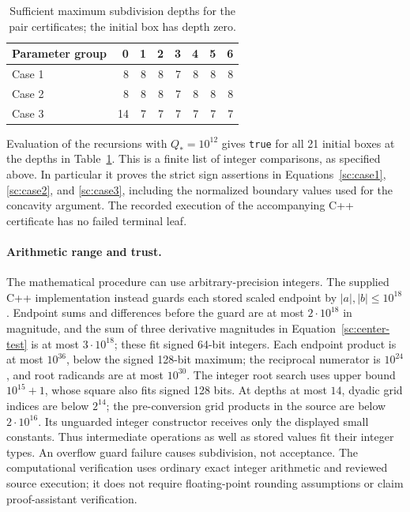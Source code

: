\begin{table}[htbp]
\centering
\begin{tabular}{lrrrrrrr}
\toprule
Parameter group &0&1&2&3&4&5&6\\
\midrule
Case 1 &8&8&8&7&8&8&8\\
Case 2 &8&8&8&7&8&8&8\\
Case 3 &14&7&7&7&7&7&7\\
\bottomrule
\end{tabular}
\caption{Sufficient maximum subdivision depths for the pair certificates;
the initial box has depth zero.}\label{sc:tab:interval-depths}
\end{table}

Evaluation of the recursions with $Q_*=10^{12}$ gives \texttt{true}
for all 21 initial boxes at the depths in
Table~\ref{sc:tab:interval-depths}.  This is a finite list of integer
comparisons, as specified above.  In particular it proves the strict
sign assertions in Equations~\eqref{sc:case1}, \eqref{sc:case2}, and \eqref{sc:case3},
including the normalized boundary values used for the concavity argument.
The recorded execution of the accompanying C++ certificate has no failed
terminal leaf.

\paragraph{Arithmetic range and trust.}
The mathematical procedure can use arbitrary-precision integers.  The
supplied C++ implementation instead guards each stored scaled endpoint
by $|a|,|b|\leq10^{18}$.  Endpoint sums and differences before the guard
are at most $2\cdot10^{18}$ in magnitude, and the sum of three derivative
magnitudes in Equation~\eqref{sc:center-test} is at most $3\cdot10^{18}$; these
fit signed 64-bit integers.  Each endpoint product is at most $10^{36}$,
below the signed 128-bit maximum; the reciprocal numerator is $10^{24}$,
and root radicands are at most $10^{30}$.  The integer root search uses
upper bound $10^{15}+1$, whose square also fits signed 128 bits.
At depths at most $14$, dyadic grid indices are below $2^{14}$; the
pre-conversion grid products in the source are below $2\cdot10^{16}$.
Its unguarded integer constructor receives only the displayed small
constants.  Thus intermediate operations as well as stored values fit
their integer types.  An overflow guard failure causes subdivision,
not acceptance.  The computational verification uses ordinary exact
integer arithmetic and reviewed source execution; it does not require
floating-point rounding assumptions or claim proof-assistant verification.


